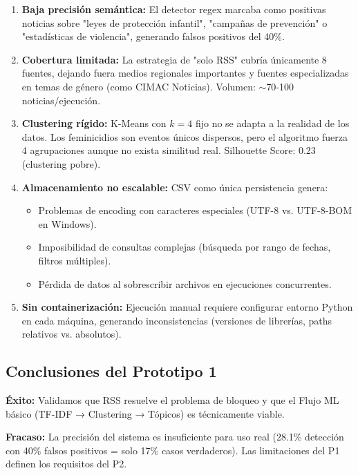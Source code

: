 \begin{enumerate}
    \item \textbf{Baja precisión semántica:} El detector regex marcaba como positivas noticias sobre "leyes de protección infantil", "campañas de prevención" o "estadísticas de violencia", generando falsos positivos del 40\%.
    
    \item \textbf{Cobertura limitada:} La estrategia de "solo RSS" cubría únicamente 8 fuentes, dejando fuera medios regionales importantes y fuentes especializadas en temas de género (como CIMAC Noticias). Volumen: $\sim$70-100 noticias/ejecución.
    
    \item \textbf{Clustering rígido:} K-Means con $k=4$ fijo no se adapta a la realidad de los datos. Los feminicidios son eventos únicos dispersos, pero el algoritmo fuerza 4 agrupaciones aunque no exista similitud real. Silhouette Score: 0.23 (clustering pobre).
    
    \item \textbf{Almacenamiento no escalable:} CSV como única persistencia genera:
    \begin{itemize}
        \item Problemas de encoding con caracteres especiales (UTF-8 vs. UTF-8-BOM en Windows).
        \item Imposibilidad de consultas complejas (búsqueda por rango de fechas, filtros múltiples).
        \item Pérdida de datos al sobrescribir archivos en ejecuciones concurrentes.
    \end{itemize}
    
    \item \textbf{Sin containerización:} Ejecución manual requiere configurar entorno Python en cada máquina, generando inconsistencias (versiones de librerías, paths relativos vs. absolutos).
\end{enumerate}

\subsection{Conclusiones del Prototipo 1}
\textbf{Éxito:} Validamos que RSS resuelve el problema de bloqueo y que el Flujo ML básico (TF-IDF → Clustering → Tópicos) es técnicamente viable.

\textbf{Fracaso:} La precisión del sistema es insuficiente para uso real (28.1\% detección con 40\% falsos positivos = solo 17\% casos verdaderos). Las limitaciones del P1 definen los requisitos del P2.

